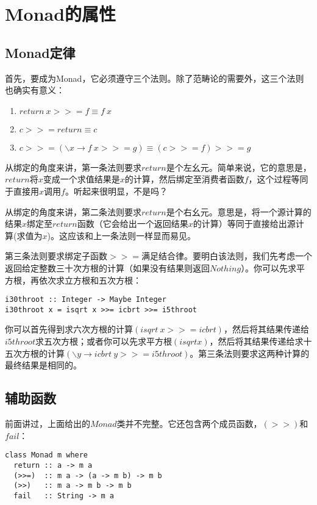 \section{Monad的属性}
\subsection{Monad定律}
首先，要成为Monad，它必须遵守三个法则。除了范畴论的需要外，这三个法则也确实有意义：
\begin{enumerate}
\item $return\ x >>=  f \equiv f\ x$
\item $c >>= return \equiv c$
\item $c >>= (\backslash{}x \rightarrow f\ x >>= g) \equiv (c >>= f) >>= g$
\end{enumerate}

从绑定的角度来讲，第一条法则要求$return$是个左幺元。简单来说，它的意思是，$return$将$x$变成一个求值结果是$x$的计算，然后绑定至消费者函数$f$，这个过程等同于直接用$x$调用$f$。听起来很明显，不是吗？

从绑定的角度来讲，第二条法则要求$return$是个右幺元。意思是，将一个源计算的结果$x$绑定至$return$函数（它会给出一个返回结果$x$的计算）等同于直接给出源计算(求值为$x$)。这应该和上一条法则一样显而易见。

第三条法则要求绑定子函数$>>=$满足结合律。要明白该法则，我们先考虑一个返回给定整数三十次方根的计算（如果没有结果则返回$Nothing$）。你可以先求平方根，再依次求立方根和五次方根：

\begin{lstlisting}
i30throot :: Integer -> Maybe Integer
i30throot x = isqrt x >>= icbrt >>= i5throot
\end{lstlisting}

你可以首先得到求六次方根的计算$(isqrt\ x >>= icbrt)$，然后将其结果传递给$i5throot$求五次方根；或者你可以先求平方根$(isqrt x)$，然后将其结果传递给求十五次方根的计算$(\backslash{}y \rightarrow icbrt\ y >>= i5throot)$。第三条法则要求这两种计算的最终结果是相同的。

\subsection{辅助函数}
前面讲过，上面给出的$Monad$类并不完整。它还包含两个成员函数，$(>>)$和$fail$：

\begin{lstlisting}
class Monad m where
  return :: a -> m a
  (>>=)  :: m a -> (a -> m b) -> m b
  (>>)   :: m a -> m b -> m b
  fail   :: String -> m a
\end{lstlisting}


